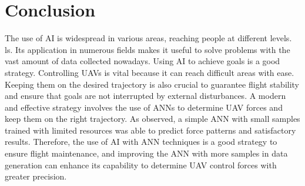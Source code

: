 \chapter{Conclusion}\label{sec:conclusion}

The use of AI is widespread in various areas, reaching people at different levels. 
ls. Its application in numerous fields makes it useful to solve problems with the vast amount of data collected nowadays.
Using AI to achieve goals is a good strategy. 
Controlling UAVs is vital because it can reach difficult areas with ease.
Keeping them on the desired trajectory is also crucial to guarantee flight stability and ensure that goals are not interrupted by external disturbances. 
A modern and effective strategy involves the use of ANNs to determine UAV forces and keep them on the right trajectory.
As observed, a simple ANN with small samples trained with limited resources was able to predict force patterns and satisfactory results.
Therefore, the use of AI with ANN techniques is a good strategy to ensure flight maintenance, and improving the ANN with more samples in data generation can enhance its capability to determine UAV control forces with greater precision.